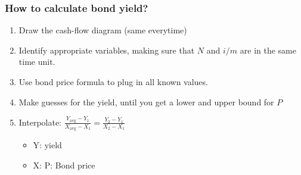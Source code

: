 \subsubsection{How to calculate bond yield?}
\begin{process}
    \begin{enumerate}
        \item Draw the cash-flow diagram (same everytime)
        \item Identify appropriate variables, making sure that $N$ and $i/m$ are in the same time unit.
        \item Use bond price formula to plug in all known values. 
        \item Make guesses for the yield, until you get a lower and upper bound for $P$ 
        \item Interpolate: $\frac{Y_{\text{avg}} - Y_1}{X_{\text{avg}} - X_1} = \frac{Y_2 - Y_1}{X_2 - X_1}$
        \begin{itemize}
            \item Y: yield
            \item X: P: Bond price
        \end{itemize}
    \end{enumerate}
\end{process}
